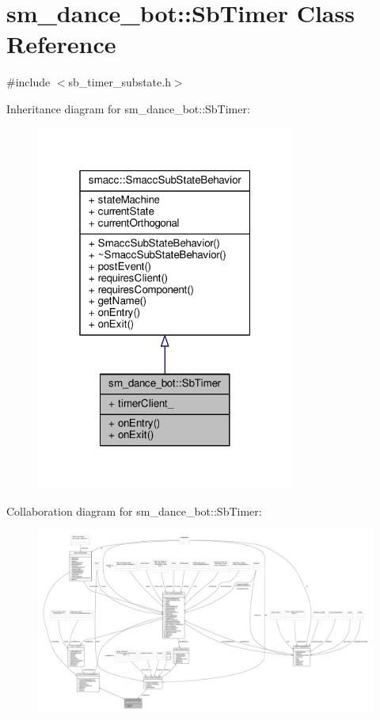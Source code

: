 \hypertarget{classsm__dance__bot_1_1SbTimer}{}\section{sm\+\_\+dance\+\_\+bot\+:\+:Sb\+Timer Class Reference}
\label{classsm__dance__bot_1_1SbTimer}


{\ttfamily \#include $<$sb\+\_\+timer\+\_\+substate.\+h$>$}



Inheritance diagram for sm\+\_\+dance\+\_\+bot\+:\+:Sb\+Timer\+:
\nopagebreak
\begin{figure}[H]
\begin{center}
\leavevmode
\includegraphics[width=241pt]{classsm__dance__bot_1_1SbTimer__inherit__graph}
\end{center}
\end{figure}


Collaboration diagram for sm\+\_\+dance\+\_\+bot\+:\+:Sb\+Timer\+:
\nopagebreak
\begin{figure}[H]
\begin{center}
\leavevmode
\includegraphics[width=350pt]{classsm__dance__bot_1_1SbTimer__coll__graph}
\end{center}
\end{figure}
